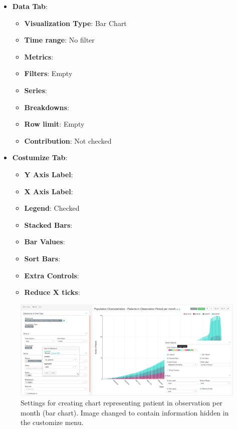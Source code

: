 \documentclass[]{book}
\providecommand{\tightlist}{%
  \setlength{\itemsep}{0pt}\setlength{\parskip}{0pt}}
\begin{document}
\begin{itemize}
\tightlist
\item
  \textbf{Data Tab}:

  \begin{itemize}
  \tightlist
  \item
    \textbf{Visualization Type}: Bar Chart
  \item
    \textbf{Time range}: No filter
  \item
    \textbf{Metrics}:
  \item
    \textbf{Filters}: Empty
  \item
    \textbf{Series}:
  \item
    \textbf{Breakdowns}:
  \item
    \textbf{Row limit}: Empty
  \item
    \textbf{Contribution}: Not checked
  \end{itemize}
\item
  \textbf{Costumize Tab}:

  \begin{itemize}
  \tightlist
  \item
    \textbf{Y Axis Label}:
  \item
    \textbf{X Axis Label}:
  \item
    \textbf{Legend}: Checked
  \item
    \textbf{Stacked Bars}:
  \item
    \textbf{Bar Values}:
  \item
    \textbf{Sort Bars}:
  \item
    \textbf{Extra Controls}:
  \item
    \textbf{Reduce X ticks}:
  \end{itemize}
\end{itemize}

\begin{figure}
\includegraphics[width=1\linewidth]{images/populationCharacteristicsPatientsInObservationPeriodPerMonth} \caption{Settings for creating chart representing patient in observation per month (bar chart). Image changed to contain information hidden in the customize menu.}\label{fig:populationCharacteristicsPatientsInObservationPeriodPerMonth}
\end{figure}
\end{document}
